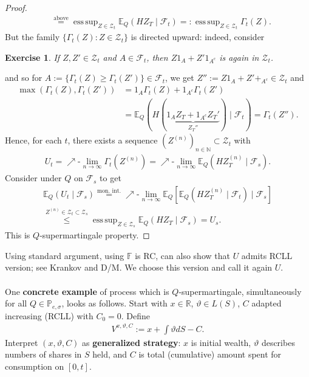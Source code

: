 \documentclass[12pt,a4paper, twoside]{article}
\newtheorem{exe}{Exercise}[section]
\theoremstyle{definition}
\newcommand{\EE}{\mathbb{E}} %
\newcommand{\PP}{\mathbb{P}} %
\DeclareMathOperator*{\esssup}{ess\,sup}
\begin{document}
\begin{proof}
\begin{align*}
&\overset{\text{above}}= \esssup_{Z \in \mathcal{Z}_t} \EE_Q( H Z_T \mid \mathcal{F}_t) =: \esssup_{Z \in \mathcal{Z}_t} \Gamma_t(Z).
\end{align*}
But the family $\{ \Gamma_t (Z): Z \in \mathcal{Z}_t\}$ is directed upward: indeed, consider 
\begin{exe} If $Z, Z' \in \mathcal{Z}_t$ and $A \in \mathcal{F}_t$, then $Z1_A + Z'1_{A^c}$ is again in $\mathcal{Z}_t$. 
\end{exe}
\noindent and so for $A:= \{ \Gamma_t(Z) \geq \Gamma_t(Z')\} \in \mathcal{F}_t$, we get $Z'':= Z1_A + Z' +_{A^c} \in \mathcal{Z}_t$ and \begin{align*}
\max( \Gamma_t(Z), \Gamma_t(Z')) &= 1_A \Gamma_t(Z) + 1_{A^c} \Gamma_t(Z')
\\ & = \EE_Q(H (\underbrace{ 1_A Z_T + 1_{A^c} Z_T'}_{Z_T''}) \mid \mathcal{F}_t) = \Gamma_t(Z'').
\end{align*}
Hence, for each $t$, there exists a sequence $(Z^{(n)})_{n \in \mathbb{N}} \subset \mathcal{Z}_t$ with \begin{align*}
 U_t = \nearrow\text{-}\lim_{n \to \infty} \Gamma_t( Z^{(n)})= \nearrow\text{-}\lim_{n \to \infty} \EE_Q(H Z_T^{(n)} \mid \mathcal{F}_s).
\end{align*}
Consider under $Q$ on $\mathcal{F}_s$ to get  
\begin{align*}
\EE_Q( U_t \mid \mathcal{F}_s) \overset{ \text{mon. int.}}= \nearrow\text{-} \lim_{n \to \infty} \EE_Q[ \EE_Q(HZ_T^{(n)} \mid \mathcal{F}_t ) \mid \mathcal{F}_s] \\
\overset{ Z^{(n)} \in \mathcal{Z}_t \subset \mathcal{Z}_s}\leq  \esssup_{Z \in \mathcal{Z}_s} \EE_Q( H Z_T \mid \mathcal{F}_s) = U_s. 
\end{align*}
This is $Q$-supermartingale property. 
\end{proof}
Using standard argument, using $\mathbb{F}$ is RC, can also show that $U$ admits RCLL version; see Krankov and D/M. We choose this version and call it again $U$. 
\\
\\
One \textbf{concrete example} of process which is $Q$-supermartingale, simultaneously for all $Q \in \PP_{e, \sigma}$, looks as follows. Start with $x \in \mathbb{R}$, $\vartheta \in L(S)$, $C$ adapted increasing (RCLL) with $C_0=0$.  Define  
\begin{align*}
V^{x, \vartheta, C} := x + \int \vartheta dS -C.
\end{align*}
Interpret $(x, \vartheta, C)$ as \textbf{generalized strategy}: $x$ is initial wealth, $\vartheta$ describes numbers of shares in $S$ held, and $C$ is total (cumulative) amount spent for consumption on $[0,t]$. 
\end{document}

